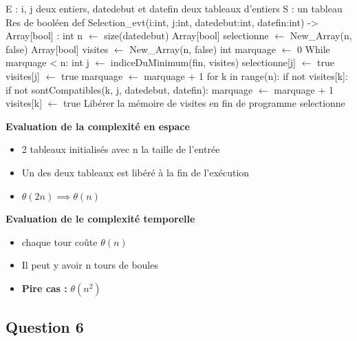 \documentclass{article}
\begin{document}
\begin{algorithm}[H]
    \caption{\textit{Première méthode}}
    \begin{algorithmic}[1]   
        \State E : i, j deux entiers, datedebut et datefin deux tableaux d'entiers
        \State S : un tableau Res de booléen
        \State def Selection\_evt(i:int, j:int, datedebut:int, datefin:int) -> Array[bool] :
        \State \qquad int n $ \leftarrow $ size(datedebut)
        \State \qquad Array[bool] selectionne $ \leftarrow $ New\_Array(n, false)
        \State \qquad Array[bool] visites $ \leftarrow $ New\_Array(n, false)
        \State \qquad int marquage $ \leftarrow $ 0
        \State \qquad While marquage < n:
        \State \qquad \qquad int j $ \leftarrow $ indiceDuMinimum(fin, visites)
        \State \qquad \qquad selectionne[j] $ \leftarrow $ true
        \State \qquad \qquad visites[j] $ \leftarrow $ true
        \State \qquad \qquad marquage $ \leftarrow $ marquage + 1 
        \State \qquad \qquad for k in range(n):
        \State \qquad \qquad \qquad if not visites[k]:
        \State \qquad \qquad \qquad \qquad if not sontCompatibles(k, j, datedebut, datefin):
        \State \qquad \qquad \qquad \qquad \qquad marquage $ \leftarrow $ marquage + 1
        \State \qquad \qquad \qquad \qquad \qquad visites[k] $ \leftarrow $ true
        \State \qquad Libérer la mémoire de visites en fin de programme
        \State \Return selectionne
    \end{algorithmic}
\end{algorithm}

\textbf{Evaluation de la complexité en espace}
\begin{itemize}
    \item 2 tableaux initialisés avec n la taille de l'entrée 
    \item Un des deux tableaux est libéré à la fin de l'exécution 
    \item $ \theta(2n)  \implies \theta(n)$
\end{itemize}

\textbf{Evaluation de le complexité temporelle}
\begin{itemize}
    \item chaque tour coûte $ \theta(n) $ 
    \item Il peut y avoir n tours de boules
    \item \textbf{Pire cas : } $ \theta(n^2) $
\end{itemize}

\subsection*{Question 6}
\end{document}
